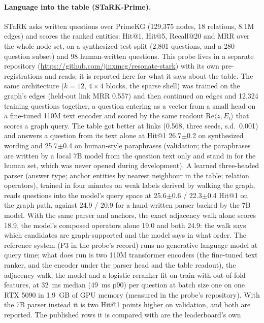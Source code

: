\documentclass[11pt,a4paper]{article}
\begin{document}
\paragraph{Language into the table (STaRK-Prime).} STaRK
\citep{wu2024stark} asks written questions over PrimeKG (129{,}375
nodes, 18 relations, 8.1M edges) and scores the ranked entities: Hit@1,
Hit@5, Recall@20 and MRR over the whole node set, on a synthesized test
split (2{,}801 questions, and a 280-question subset) and 98 human-written
questions. This probe lives in a separate repository
(\url{https://github.com/jinxmcg/resonate-stark}) with its own
pre-registrations and reads; it is reported here for what it says about
the table. The same architecture ($k=12$, $4\times4$ blocks, the sparse
shell) was trained on the graph's edges (held-out link MRR 0.557) and
then continued on edges and 12{,}324 training questions together, a
question entering as a vector from a small head on a fine-tuned 110M
text encoder and scored by the same readout $\mathrm{Re}\langle z,
E_t\rangle$ that scores a graph query. The table got better at links
(0.568, three seeds, s.d.\ 0.001) and answers a question from its text
alone at Hit@1 26.7$\pm$0.2 on synthesized wording and 25.7$\pm$0.4 on
human-style paraphrases (validation; the paraphrases are written by a
local 7B model from the question text only and stand in for the
human set, which was never opened during development). A learned
three-headed parser (answer type; anchor entities by nearest neighbour
in the table; relation operators), trained in four minutes on weak
labels derived by walking the graph, reads questions into the model's
query space at 25.6$\pm$0.6 / 22.3$\pm$0.4 Hit@1 on the graph path,
against 24.9 / 20.9 for a hand-written parser backed by the 7B model.
With the same parser and anchors, the exact adjacency walk alone scores
18.9, the model's composed operators alone 19.0 and both 24.9: the walk
says which candidates are graph-supported and the model says in what
order. The reference system (P3 in the probe's record) runs no generative language model at query time;
what does run is two 110M transformer encoders (the fine-tuned text
ranker, and the encoder under the parser head and the table readout),
the adjacency walk, the model and a logistic reranker fit on train with
out-of-fold features, at 32~ms median (49~ms p90) per question at batch size one on one
RTX 5090 in 1.9~GB of GPU memory (measured in the probe's repository). With the 7B parser instead it
is two Hit@1 points higher on validation, and both are reported. The
published rows it is compared with are the leaderboard's own
\end{document}
